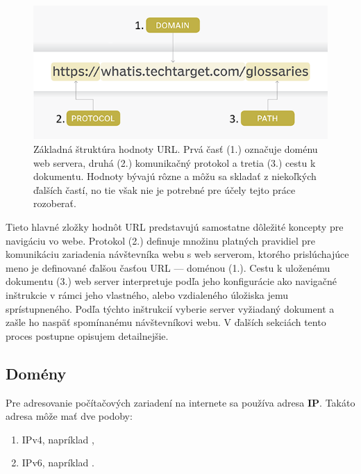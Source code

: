 \begin{figure}[htb]
\begin{center}
 \includegraphics[scale=0.52]{obrazky-figures/the-anatomy-of-a-url.png}
 \caption{\centering Základná štruktúra hodnoty URL. Prvá časť (1.) označuje doménu web servera, druhá (2.) komunikačný protokol a tretia (3.) cestu k dokumentu. Hodnoty bývajú rôzne a môžu sa skladať z niekoľkých ďalších častí, no tie však nie je potrebné pre účely tejto práce rozoberať.}
 \label{img:urlstructure}
\end{center}
\end{figure}

\pagebreak

Tieto hlavné zložky hodnôt URL predstavujú samostatne dôležité koncepty pre navigáciu vo webe.
Protokol (2.) definuje množinu platných pravidiel pre komunikáciu zariadenia návštevníka webu s web 
serverom, ktorého prislúchajúce meno je definované ďalšou časťou URL --- doménou (1.). 
Cestu k uloženému dokumentu (3.) web server interpretuje podľa jeho konfigurácie ako navigačné inštrukcie 
v rámci jeho vlastného, alebo vzdialeného úložiska jemu sprístupneného. 
Podľa týchto inštrukcií vyberie server vyžiadaný dokument a zašle ho naspäť spomínanému návštevníkovi webu.
V ďalších sekciách tento proces postupne opisujem detailnejšie.

\subsection{Domény}
\label{domeny}

Pre adresovanie počítačových zariadení na internete sa používa adresa \textbf{IP}.
Takáto adresa môže mať dve podoby:
\begin{enumerate}
    \item IPv4, napríklad ,
    \item IPv6, napríklad .
\end{enumerate}


